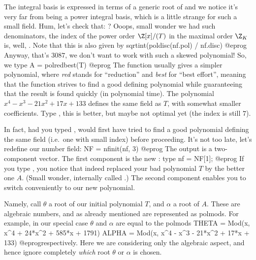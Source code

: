 The integral basis is expressed in terms of a generic root  of 
and we notice it's very far from being a power integral basis, which is a
little strange for such a small field. Hum, let's check that: ?
Ooops, small wonder we had such denominators, the index of the power order
$\Z[x]/(T)$ in the maximal order $\Z_K$ is, well,
. Note that this is also given by
\bprog
  sqrtint(poldisc(nf.pol) / nf.disc)
@eprog\noindent
Anyway, that's $3087$, we don't want to work with such a skewed polynomial!
So, we type
\bprog
  A = polredbest(T)
@eprog\noindent
The  function usually gives a simpler polynomial, where
\emph{red} stands for ``reduction'' and \emph{best} for ``best effort'',
meaning that the function strives to find a good defining polynomial
while guaranteeing that the result is found quickly (in polynomial time).
The polynomial $x^4-x^3-21x^2+17x+133$ defines the same field as $T$, with
somewhat smaller coefficients. Type , this is better, but
maybe not optimal yet (the index is still $7$).

In fact, had you typed ,  would first have
tried to find a good polynomial defining the same field (i.e.~one with small
index) before proceeding. It's not too late, let's redefine our number field:
\bprog
  NF = nfinit(nf, 3)
@eprog\noindent
The output is a two-component vector. The first component is the new
: type
\bprog
  nf = NF[1];
@eprog\noindent
If you type , you notice that  indeed replaced your bad
polynomial $T$ by the better one $A$. (Small wonder,  internally
called .) The second component enables you to switch
conveniently to our new polynomial.

Namely, call $\theta$ a root of our initial polynomial $T$, and $\alpha$
a root of $A$. These are
algebraic numbers, and as already mentioned are represented as polmods. For
example, in our special case $\theta$ and $\alpha$ are equal to the polmods
\bprog
  THETA = Mod(x, x^4 + 24*x^2 + 585*x + 1791)
  ALPHA = Mod(x, x^4 - x^3 - 21*x^2 + 17*x + 133)
@eprog\noindent respectively. Here we are considering only the algebraic
aspect, and hence ignore completely \emph{which} root $\theta$ or $\alpha$ is
chosen.

